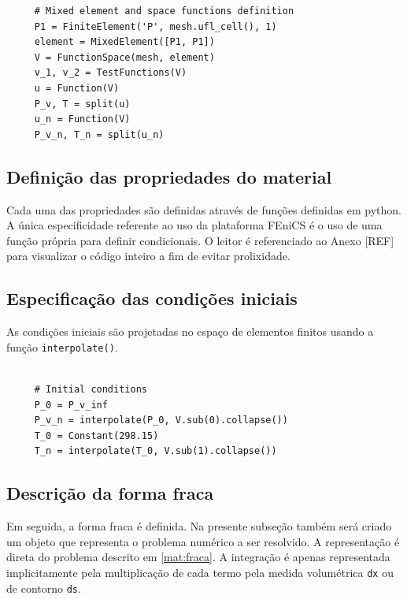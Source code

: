      \begin{verbatim}
     # Mixed element and space functions definition
     P1 = FiniteElement('P', mesh.ufl_cell(), 1)
     element = MixedElement([P1, P1])
     V = FunctionSpace(mesh, element)
     v_1, v_2 = TestFunctions(V)
     u = Function(V)
     P_v, T = split(u)
     u_n = Function(V)
     P_v_n, T_n = split(u_n)

    \end{verbatim} 
   
    \subsection{Definição das propriedades do material}
    Cada uma das propriedades são definidas através de funções definidas em
    python. A única especificidade referente ao uso da plataforma FEniCS é o uso
    de uma função própria para definir condicionais. O leitor é referenciado ao
    Anexo [REF] para visualizar o código inteiro a fim de evitar prolixidade. 

    \subsection{Especificação das condições iniciais}
    As condições iniciais são projetadas no espaço de elementos finitos usando a
    função \texttt{interpolate()}.
    
    \begin{verbatim}
     
     # Initial conditions
     P_0 = P_v_inf
     P_v_n = interpolate(P_0, V.sub(0).collapse())
     T_0 = Constant(298.15)
     T_n = interpolate(T_0, V.sub(1).collapse())
    \end{verbatim} 

    \subsection{Descrição da forma fraca}
    Em seguida, a forma fraca é definida. Na presente subseção também será
    criado um objeto que representa o problema numérico a ser resolvido.
    A representação é direta do problema descrito em \ref{mat:fraca}. A
    integração é apenas representada implicitamente pela
    multiplicação de cada termo pela medida volumétrica
    \texttt{dx} ou de contorno
    \texttt{ds}.

